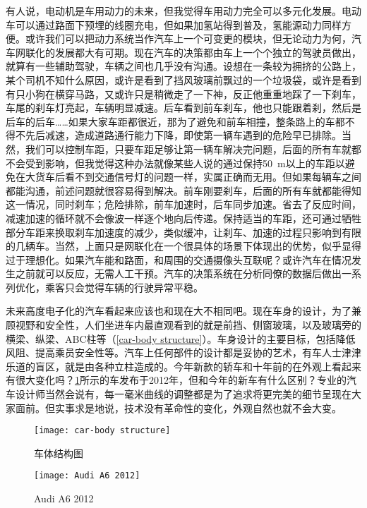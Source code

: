 \documentclass[UTF8]{ctexart}
\numberwithin{figure}{section}
\numberwithin{table}{section}
\begin{document}
有人说，电动机是车用动力的未来，但我觉得车用动力完全可以多元化发展。电动车可以通过路面下预埋的线圈充电，但如果加氢站得到普及，氢能源动力同样方便。或许我们可以把动力系统当作汽车上一个可变更的模块，但无论动力为何，汽车网联化的发展都大有可期。现在汽车的决策都由车上一个个独立的驾驶员做出，就算有一些辅助驾驶，车辆之间也几乎没有沟通。设想在一条较为拥挤的公路上，某个司机不知什么原因，或许是看到了挡风玻璃前飘过的一个垃圾袋，或许是看到有只小狗在横穿马路，又或许只是稍微走了一下神，反正他重重地踩了一下刹车，车尾的刹车灯亮起，车辆明显减速。后车看到前车刹车，他也只能跟着刹，然后是后车的后车……如果大家车距都很近，那为了避免和前车相撞，整条路上的车都不得不先后减速，造成道路通行能力下降，即使第一辆车遇到的危险早已排除。当然，我们可以控制车距，只要车距足够让第一辆车解决完问题，后面的所有车就都不会受到影响，但我觉得这种办法就像某些人说的通过保持\SI{50}{\meter}以上的车距以避免在大货车后看不到交通信号灯的问题一样，实属正确而无用。但如果每辆车之间都能沟通，前述问题就很容易得到解决。前车刚要刹车，后面的所有车就都能得知这一情况，同时刹车；危险排除，前车加速时，后车同步加速。省去了反应时间，减速加速的循环就不会像波一样逐个地向后传递。保持适当的车距，还可通过牺牲部分车距来换取刹车加速度的减少，类似缓冲，让刹车、加速的过程只影响到有限的几辆车。当然，上面只是网联化在一个很具体的场景下体现出的优势，似乎显得过于理想化。如果汽车能和路面，和周围的交通摄像头互联呢？或许汽车在情况发生之前就可以反应，无需人工干预。汽车的决策系统在分析同僚的数据后做出一系列优化，乘客只会觉得车辆的行驶异常平稳。

未来高度电子化的汽车看起来应该也和现在大不相同吧。现在车身的设计，为了兼顾视野和安全性，人们坐进车内最直观看到的就是前挡、侧窗玻璃，以及玻璃旁的横梁、纵梁、ABC柱等（\cref{car-body structure}）。车身设计的主要目标，包括降低风阻、提高乘员安全性等。汽车上任何部件的设计都是妥协的艺术，有车人士津津乐道的盲区，就是由各种立柱造成的。今年新款的轿车和十年前的在外观上看起来有很大变化吗？\cref{Audi A6 2012}所示的车发布于2012年，但和今年的新车有什么区别？专业的汽车设计师当然会说有，每一毫米曲线的调整都是为了追求将更完美的细节呈现在大家面前。但实事求是地说，技术没有革命性的变化，外观自然也就不会大变。

\begin{figure}[htbp]
	\centering
	\begin{minipage}[b]{0.45\textwidth}
		\centering
		\texttt{[image: car-body structure]}
		\caption{车体结构图}
		\label{car-body structure}
	\end{minipage}
	\begin{minipage}[b]{0.5\textwidth}
		\centering
		\texttt{[image: Audi A6 2012]}
		\caption{Audi A6 2012}
		\label{Audi A6 2012}
	\end{minipage}
\end{figure}
\end{document}
